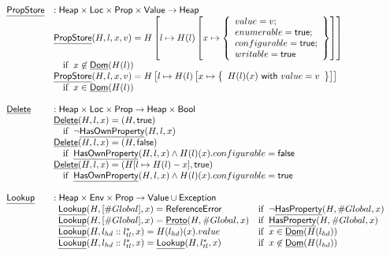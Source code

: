 \documentclass{article}
\newcommand{\SF}[1]{\mbox{\textsf{#1}}}
\newcommand{\ifc}[1]{{\rm if}\begin{array}[t]{l}#1\end{array}}
\newcommand{\Heap}{\SF{Heap}}
\newcommand{\Loc}{\SF{Loc}}
\newcommand{\Prop}{\SF{Prop}}
\newcommand{\Value}{\SF{Value}}
\newcommand{\set}[1]{\left\{\begin{array}{l}#1\end{array}\right\}}
\newcommand{\hf}[1]{\underline{\sf #1}}
\newcommand{\exc}[1]{{\sf #1}}
\newcommand{\varloc}[1]{\##1}
\newcommand{\vtrue}{\SF{true}}
\newcommand{\vfalse}{\SF{false}}
\newcommand{\rwith}{~{\sf with}~}
\begin{document}
\[\begin{array}{ll}
\hf{PropStore} & : \Heap \times \Loc \times \Prop \times \Value \rightarrow \Heap \\
& \hf{PropStore}(H,l,x,v)
  = H\left[l\mapsto H(l)\left[x\mapsto \set{
    value=v;\\
   enumerable=\vtrue;\\
    configurable=\vtrue;\\
    writable=\vtrue
 }\right]\right]\\
& \quad\ifc{x\not\in \hf{Dom}(H(l))} \\
& \hf{PropStore}(H,l,x,v)
  = H\left[l\mapsto H(l)\left[x\mapsto \set{H(l)(x)\rwith value=v}\right]\right]\\
& \quad\ifc{x\in \hf{Dom}(H(l))} \\

\\
\hf{Delete} & : \Heap \times \Loc \times \Prop \rightarrow \Heap
\times \SF{Bool}\\
& \hf{Delete}(H,l,x)
  =  (H,\vtrue)\\
& \quad\ifc{\lnot\hf{HasOwnProperty}(H,l,x)} \\
& \hf{Delete}(H,l,x)
  =  (H,\vfalse)\\
& \quad\ifc{\hf{HasOwnProperty}(H,l,x)\land
    H(l)(x).configurable = \vfalse} \\
& \hf{Delete}(H,l,x)
  =  (H[l\mapsto H(l) - x],\vtrue)\\
& \quad\ifc{\hf{HasOwnProperty}(H,l,x) \land H(l)(x).configurable = \vtrue} \\\\

\hf{Lookup} & : \Heap \times \SF{Env} \times \Prop \rightarrow \Value \cup \SF{Exception}\\

&
\begin{array}{ll}

  \hf{Lookup}(H,[\varloc{Global}],x)
  =  \exc{ReferenceError} & \ifc{\lnot\hf{HasProperty}(H,\varloc{Global},x)} \\
  \hf{Lookup}(H,[\varloc{Global}],x)
  =  \hf{Proto}(H, \varloc{Global}, x) & \ifc{\hf{HasProperty}(H,\varloc{Global},x)}\\
  \hf{Lookup}(H,l_{hd}::l_{tl}^{*},x)
   =  H(l_{hd})(x).value & \ifc{x\in\hf{Dom}(H(l_{hd}))} \\
   \hf{Lookup}(H,l_{hd}::l_{tl}^{*},x)
   =  \hf{Lookup}(H, l_{tl}^{*},x) & \ifc{x\not\in\hf{Dom}(H(l_{hd}))}\\
\end{array}\\
\\
\end{array}
\]
\end{document}
